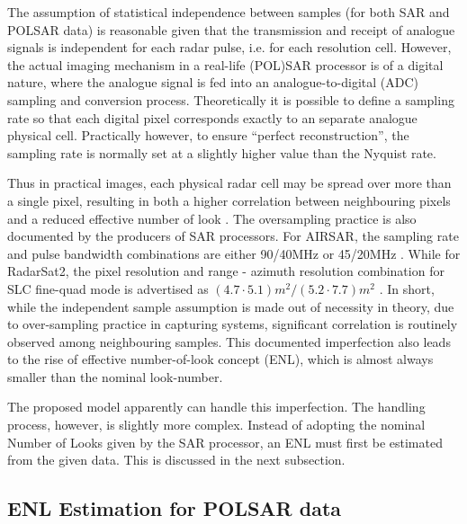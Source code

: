 \documentclass[journal]{IEEEtran}
\begin{document}
The assumption of statistical independence between samples (for both SAR and POLSAR data) is reasonable given that 
  the transmission and receipt of analogue signals is independent for each radar pulse, i.e. for each resolution cell.
However, the actual imaging mechanism in a real-life (POL)SAR processor is of a digital nature,
  where the analogue signal is fed into an analogue-to-digital (ADC) sampling and conversion process.  
Theoretically it is possible to define a sampling rate so that each digital pixel corresponds exactly to an separate analogue physical cell.
Practically however, to ensure ``perfect reconstruction'', the sampling rate is normally set at a slightly higher value than the Nyquist rate. 

Thus in practical images, each physical radar cell may be spread over more than a single pixel,
resulting in both %
  a higher correlation between neighbouring pixels \cite{Raney_1988_TGRS_666} %
  and a reduced effective number of look\cite{Lee_1994_TGRS_1017} \cite{Anfinsen_2009_TGRS_3795}. 
The oversampling practice is also documented by the producers of SAR processors.
For AIRSAR, the sampling rate and pulse bandwidth combinations are either 90/40MHz or 45/20MHz \cite{JPL_2013_Web_AIRSAR_Impl}.
While for RadarSat2, the pixel resolution and range - azimuth resolution combination for SLC fine-quad mode is advertised as $(4.7 \cdot 5.1)m^2/(5.2 \cdot 7.7)m^2$ \cite{MDA_2013_Web_RadatSat2_Description}.
In short, while the independent sample assumption is made out of necessity in theory,
  due to over-sampling practice in capturing systems, significant correlation is routinely observed among neighbouring samples. %
This documented imperfection also leads to the rise of effective number-of-look concept (ENL),
  which is almost always smaller than the nominal look-number. 

The proposed model apparently can handle this imperfection. %
The handling process, however, is slightly more complex.
Instead of adopting the nominal Number of Looks given by the SAR processor,
  an ENL must first be estimated from the given data.
This is discussed in the next subsection.

\subsection{ENL Estimation for POLSAR data}
\label{sec:valid_enl_estimation}
\end{document}
